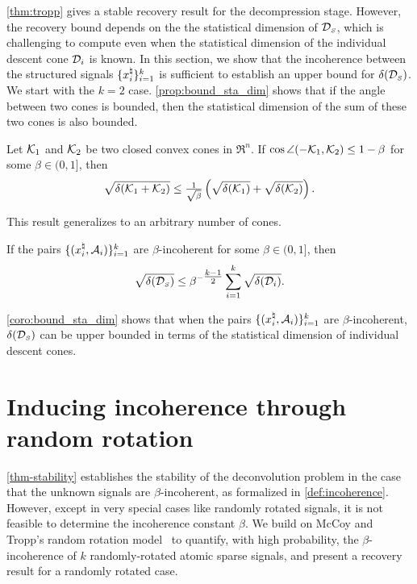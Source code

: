 \autoref{thm:tropp} gives a stable recovery result for the decompression stage. However, the recovery bound depends on the the statistical dimension of $\mathcal{D}_{\scriptscriptstyle S}$, which is challenging to compute even when the statistical dimension of the individual descent cone $\mathcal{D}_i$ is known. In this section, we show that the incoherence between the structured signals $\{x_i^{\natural}\}_{i=1}^k$ is sufficient to establish an upper bound for $\delta(\mathcal{D}_{\scriptscriptstyle S})$. 
We start with the $k = 2$ case. \autoref{prop:bound_sta_dim} shows that if the angle between two cones is bounded, then the statistical dimension of the sum of these two cones is also bounded. 

\begin{proposition}\label{prop:bound_sta_dim}
    Let $\mathcal{K}_1$ and $\mathcal{K}_2$ be two closed convex cones in $\Re^n$. If $\cos\angle(-\mathcal{K}_1, \mathcal{K}_2) \leq 1 - \beta$ for some $\beta \in (0, 1]$, then 
    \[\sqrt{\delta(\mathcal{K}_1 + \mathcal{K}_2)} \leq \tfrac{1}{\sqrt{\beta}}\left(\sqrt{\delta(\mathcal{K}_1)} + \sqrt{\delta(\mathcal{K}_2)} \right).\]
\end{proposition}

This result generalizes to an arbitrary number of cones. 
\begin{corollary}\label{coro:bound_sta_dim}
   If the pairs $\{(x_i^{\natural}, \mathcal{A}_i)\}_{i=1}^k$ are $\beta$-incoherent for some $\beta\in(0,1]$, then
   \[\sqrt{\delta(\mathcal{D}_{\scriptscriptstyle S})} \leq \beta^{-\tfrac{k-1}{2}}\sum_{i=1}^k\sqrt{\delta(\mathcal{D}_i)}.\]
\end{corollary} 
\autoref{coro:bound_sta_dim} shows that when the pairs $\{(x_i^{\natural}, \mathcal{A}_i)\}_{i=1}^k$ are $\beta$-incoherent, $\delta(\mathcal{D}_{\scriptscriptstyle S})$ can be upper bounded in terms of the statistical dimension of individual descent cones.

\section{Inducing incoherence through random rotation}\label{sec-incoherence}

\autoref{thm-stability} establishes the stability of the deconvolution problem in the case that the unknown signals are $\beta$-incoherent, as formalized in \autoref{def:incoherence}. However, except in very special cases like randomly rotated signals, it is not feasible to determine the incoherence constant $\beta$. We build on McCoy and Tropp's random rotation model~\cite{mccoy2013achievable} to quantify, with high probability, the $\beta$-incoherence of $k$ randomly-rotated atomic sparse signals, and present a recovery result for a randomly rotated case.

